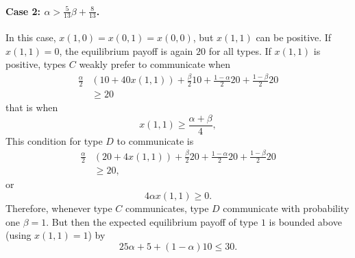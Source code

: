 \documentclass[12pt]{article}
\theoremstyle{break}
\begin{document}
\paragraph{Case 2: $\alpha > \frac{5}{13}\beta+\frac{8}{13}$.} In this case, $x(1,0)=x(0,1)=x(0,0)$, but $x(1,1)$ can be positive. If $x(1,1)=0$, the equilibrium payoff is again $20$ for all types. If $x(1,1)$ is positive, types $C$ weakly prefer to communicate when
\begin{equation}\label{IC-comm-CWC}
	\begin{split}
	\frac{\alpha}{2}& (10+40x(1,1))+\frac{\beta}{2}10+\frac{1-\alpha}{2}20+\frac{1-\beta}{2}20\\ 
	&\geq 20
	\end{split}
\end{equation}
that is when
%
\begin{equation}
	x(1,1)\geq \frac{\alpha+\beta}{4},
\end{equation}
%
This condition for type $D$ to communicate is 
%
\begin{align*}
	\frac{\alpha}{2}& (20+4x(1,1))+\frac{\beta}{2}20+\frac{1-\alpha}{2}20+\frac{1-\beta}{2}20\\ 
	&\geq 20,
\end{align*}
%
or 
%
\[
4\alpha x(1,1)\geq 0.
\]
%
Therefore, whenever type $C$ communicates, type $D$ communicate with probability one $\beta=1$.  But then the expected equilibrium payoff of type $1$ is bounded above (using $x(1,1)=1$) by
%
\[
	25\alpha+5+(1-\alpha)10\leq 30.
\]
%
\end{document}

